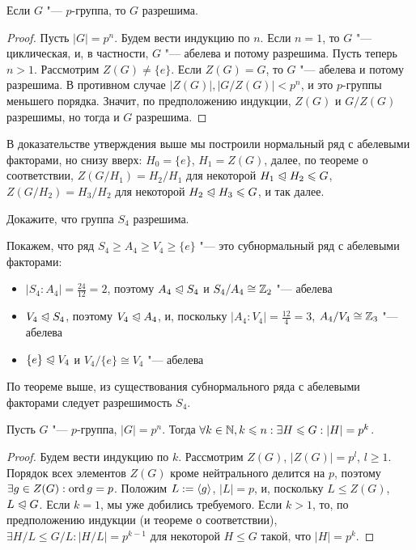 \begin{proposition}
	Если $G$ "--- $p$-группа, то $G$ разрешима.
\end{proposition}

\begin{proof}
	Пусть $|G| = p^n$. Будем вести индукцию по $n$. Если $n = 1$, то $G$ "--- циклическая, и, в частности, $G$ "--- абелева и потому разрешима. Пусть теперь $n > 1$. Рассмотрим $Z(G) \ne \{e\}$. Если $Z(G) = G$, то $G$ "--- абелева и потому разрешима. В противном случае $|Z(G)|, |G/Z(G)| < p^n$, и это $p$-группы меньшего порядка. Значит, по предположению индукции, $Z(G)$ и $G/Z(G)$ разрешимы, но тогда и $G$ разрешима.
\end{proof}

\begin{note}
	В доказательстве утверждения выше мы построили нормальный ряд с абелевыми факторами, но снизу вверх: $H_0 = \{e\}$, $H_1 = Z(G)$, далее, по теореме о соответствии, $Z(G/H_1) = H_2/H_1$ для некоторой $H_1 \trianglelefteqslant H_2 \leqslant G$, $Z(G/H_2) = H_3/H_2$ для некоторой $H_2 \trianglelefteqslant H_3 \leqslant G$, и так далее.
\end{note}

\begin{exercise}
	Докажите, что группа $S_4$ разрешима.
\end{exercise}

\begin{solution}
	Покажем, что ряд $S_4 \ge A_4 \ge V_4 \ge \{e\}$ "--- это субнормальный ряд с абелевыми факторами:
	\begin{itemize}
		\item $|S_4 : A_4| = \frac{24}{12} = 2$, поэтому $A_4 \trianglelefteqslant S_4$ и $S_4/A_4 \cong \mathbb{Z}_2$ "--- абелева
		\item $V_4 \trianglelefteqslant S_4$, поэтому $V_4 \trianglelefteqslant A_4$, и, поскольку $|A_4 : V_4| = \frac{12}{4} = 3$, $A_4/V_4 \cong \mathbb{Z}_3$ "--- абелева
		\item $\{e\} \trianglelefteqslant V_4$ и $V_4/\{e\} \cong V_4$ "--- абелева
	\end{itemize}
	
	По теореме выше, из существования субнормального ряда с абелевыми факторами следует разрешимость $S_4$.
\end{solution}

\begin{theorem}
	Пусть $G$ "--- $p$-группа, $|G| = p^n$. Тогда $\forall k \in \mathbb{N}, k \leqslant n: \exists H \leqslant G: |H| = p^k$.
\end{theorem}

\begin{proof}
	Будем вести индукцию по $k$. Рассмотрим $Z(G)$, $|Z(G)| = p^l$, $l \ge 1$. Порядок всех элементов $Z(G)$ кроме нейтрального делится на $p$, поэтому $\exists g \in Z(G): \operatorname{ord}{g} = p$. Положим $L := \langle g\rangle$, $|L| = p$, и, поскольку $L \le Z(G)$, $L \trianglelefteqslant G$. Если $k = 1$, мы уже добились требуемого. Если $k > 1$, то, по предположению индукции (и теореме о соответствии), $\exists H / L \le G / L: |H / L| = p^{k-1}$ для некоторой $H \le G$ такой, что $|H| = p^k$.
\end{proof}

